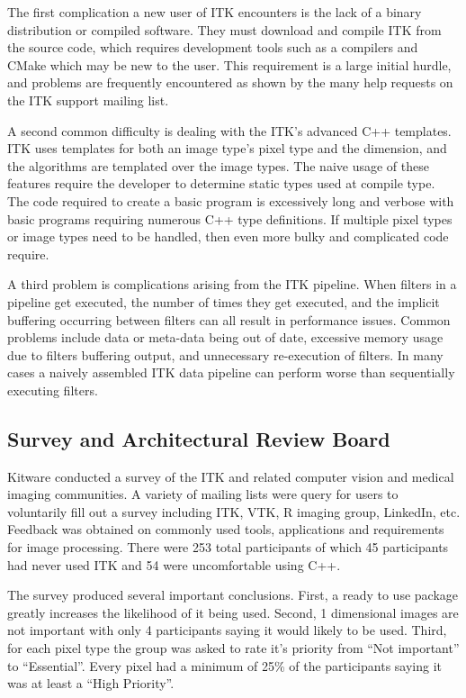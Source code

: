 \documentclass{frontiersMED} %
\begin{document}
The first complication a new user of ITK encounters is the lack of a
binary distribution or compiled software. They must download and
compile ITK from the source code, which requires development tools
such as a compilers and CMake which may be new to the user. This
requirement is a large initial hurdle, and problems are frequently
encountered as shown by the many help requests on the ITK support
mailing list.

A second common difficulty is dealing with the ITK’s advanced C++
templates. ITK uses templates for both an image type’s pixel type and
the dimension, and the algorithms are templated over the image
types. The naive usage of these features require the developer to
determine static types used at compile type.  The code required to
create a basic program is excessively long and verbose with basic
programs requiring numerous C++ type definitions.  If multiple pixel
types or image types need to be handled, then even more bulky and
complicated code require.

A third problem is complications arising from the ITK pipeline. When
filters in a pipeline get executed, the number of times they get
executed, and the implicit buffering occurring between filters can all
result in performance issues. Common problems include data or
meta-data being out of date, excessive memory usage due to filters
buffering output, and unnecessary re-execution of filters. In many
cases a naively assembled ITK data pipeline can perform worse than
sequentially executing filters.


\subsection {Survey and Architectural Review Board}
Kitware conducted a survey of the ITK and related computer vision and
medical imaging communities. A variety of mailing lists were query for
users to voluntarily fill out a survey including ITK, VTK, R imaging
group, LinkedIn, etc. Feedback was obtained on commonly used tools,
applications and requirements for image processing. There were 253
total participants of which 45 participants had never used ITK and 54
were uncomfortable using C++.

The survey produced several important conclusions. First, a ready to
use package greatly increases the likelihood of it being used. Second,
1 dimensional images are not important with only 4 participants saying
it would likely to be used. Third, for each pixel type the group was
asked to rate it’s priority from “Not important” to “Essential”. Every
pixel had a minimum of 25\% of the participants saying it was at least
a “High Priority”.
\end{document}
